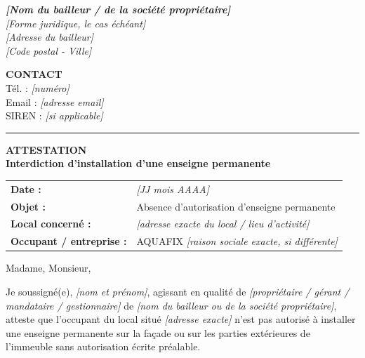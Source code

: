 \documentclass[10pt,a4paper]{article}
\newcommand{\field}[1]{\textcolor{muted}{\textit{[#1]}}}
\newcommand{\smallcapslabel}[1]{{\sffamily\bfseries\footnotesize\MakeUppercase{#1}}}
\begin{document}
\color{ink}

\noindent
\begin{minipage}[t]{0.56\textwidth}
{\sffamily\bfseries\Large \field{Nom du bailleur / de la société propriétaire}}\\[2pt]
{\small \field{Forme juridique, le cas échéant}}\\
{\small \field{Adresse du bailleur}}\\
{\small \field{Code postal - Ville}}
\end{minipage}
\hfill
\begin{minipage}[t]{0.38\textwidth}
\raggedleft
{\small \smallcapslabel{Contact}}\\[3pt]
{\small Tél. : \field{numéro}}\\
{\small Email : \field{adresse email}}\\
{\small SIREN : \field{si applicable}}
\end{minipage}

\vspace{6mm}
\noindent\color{rule}\rule{\textwidth}{0.6pt}\color{ink}

\vspace{7mm}
\begin{center}
{\sffamily\bfseries\LARGE ATTESTATION}\\[4pt]
{\sffamily\bfseries\large Interdiction d'installation d'une enseigne permanente}
\end{center}

\vspace{6mm}

\noindent
\begin{tabularx}{\textwidth}{>{\bfseries}l X}
Date : & \field{JJ mois AAAA} \\
Objet : & Absence d'autorisation d'enseigne permanente \\
Local concerné : & \field{adresse exacte du local / lieu d'activité} \\
Occupant / entreprise : & AQUAFIX \field{raison sociale exacte, si différente} \\
\end{tabularx}

\vspace{6mm}

Madame, Monsieur,

\vspace{3mm}

Je soussigné(e), \field{nom et prénom}, agissant en qualité de \field{propriétaire / gérant / mandataire / gestionnaire} de \field{nom du bailleur ou de la société propriétaire}, atteste que l'occupant du local situé \field{adresse exacte} n'est pas autorisé à installer une enseigne permanente sur la façade ou sur les parties extérieures de l'immeuble sans autorisation écrite préalable.
\end{document}
